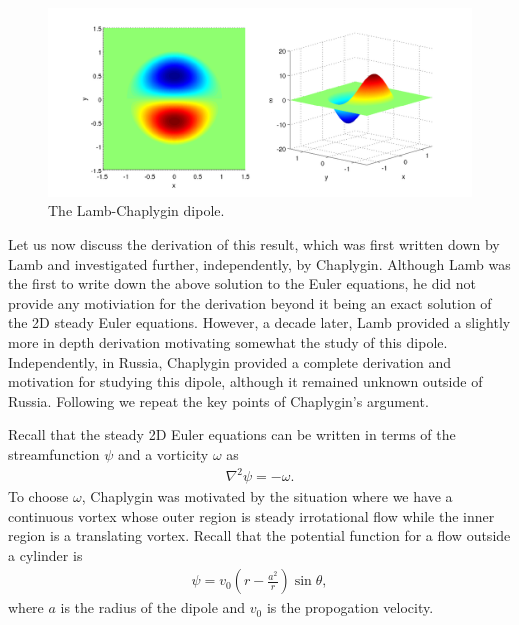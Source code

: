 \begin{figure}
\begin{center}
\includegraphics[width=\textwidth]{lamb_dipole}
\caption{The Lamb-Chaplygin dipole.}
\label{lamb_dipole_plot}
\end{center}
\end{figure}
Let us now discuss the derivation of this result, which was first written down by Lamb and investigated further, independently, by Chaplygin. Although Lamb was the first to write down the above solution to the Euler equations, he did not provide any motiviation for the derivation beyond it being an exact solution of the 2D steady Euler equations. However, a decade later, Lamb provided a slightly more in depth derivation motivating somewhat the study of this dipole. Independently, in Russia, Chaplygin provided a complete derivation and motivation for studying this dipole, although it remained unknown outside of Russia. Following \cite{meleshko1994} we repeat the key points of Chaplygin's argument. 

Recall that the steady 2D Euler equations can be written in terms of the streamfunction $\psi$ and a vorticity $\omega$ as
\begin{align}
\nabla^{2} \psi = - \omega.\label{vort_eq_chap}
\end{align}
To choose $\omega$, Chaplygin was motivated by the situation where we have a continuous vortex whose outer region is steady irrotational flow while the inner region is a translating vortex. Recall that the potential function for a flow outside a cylinder is
\begin{align}
\psi = v_{0}\left(r - \frac{a^{2}}{r}\right)\sin\theta ,
\end{align}
where $a$ is the radius of the dipole and $v_{0}$ is the propogation velocity. 

